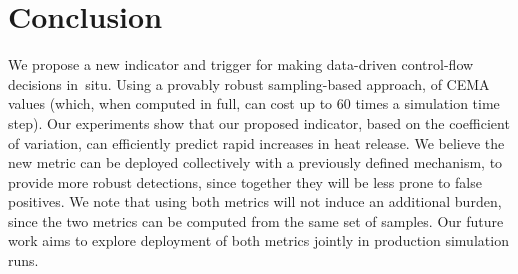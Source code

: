 \documentclass{sig-alternate}
\begin{document}
\section{Conclusion}
\label{sec:conc} 
We propose a new indicator and trigger 
for making data-driven control-flow decisions in~situ. Using a provably robust
sampling-based approach, 
of CEMA values (which, when computed in full, can cost up to 60 times a
simulation time step).  Our experiments show that our proposed indicator, based
on the coefficient of variation, can  efficiently predict rapid increases in heat
release.  We believe the new metric 
can be deployed collectively with a previously defined mechanism, 
to  provide more robust detections, since together they will be  less prone to false positives. We  note that  using both metrics 
will not induce an additional burden, since the two metrics  can be computed
from the same set of samples.  Our future work aims to explore deployment of
both metrics jointly in production simulation runs. 
\end{document}
